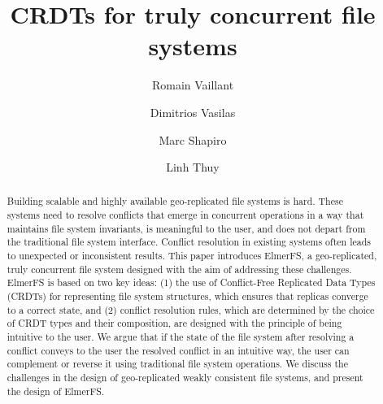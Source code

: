 \documentclass[sigconf, 10pt]{acmart}
\begin{document}
\title{CRDTs for truly concurrent file systems}

\author{Romain Vaillant}

\author{Dimitrios Vasilas}

\author{Marc Shapiro}

\author{Linh Thuy}

\renewcommand{\shortauthors}{R. Vaillant et al.}

\begin{abstract}

Building scalable and highly available geo-replicated file
systems is hard. These systems need to resolve conflicts that
emerge in concurrent operations in a way that maintains
file system invariants, is meaningful to the user, and does
not depart from the traditional file system interface. Conflict
resolution in existing systems often leads to unexpected
or inconsistent results. This paper introduces ElmerFS, a
geo-replicated, truly concurrent file system designed with
the aim of addressing these challenges. ElmerFS is based
on two key ideas: (1) the use of Conflict-Free Replicated
Data Types (CRDTs) for representing file system structures,
which ensures that replicas converge to a correct state, and
(2) conflict resolution rules, which are determined by the
choice of CRDT types and their composition, are designed
with the principle of being intuitive to the user. We argue
that if the state of the file system after resolving a conflict
conveys to the user the resolved conflict in an intuitive way,
the user can complement or reverse it using traditional file
system operations. We discuss the challenges in the design
of geo-replicated weakly consistent file systems, and present
the design of ElmerFS.

\end{abstract}

\end{document}
